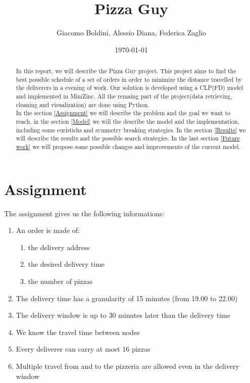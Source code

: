 \documentclass[10pt]{article}
\title{Pizza Guy}
\date{\today}
\author{Giacomo Boldini, Alessio Diana, Federica Zaglio}
\begin{document}
	\maketitle

	\begin{abstract}

		In this report, we will describe the Pizza Guy project. This project 
		aims to find the best possible schedule of a set of orders in order to
		minimize the distance travelled by the deliverers in a evening of 
		work. Our solution is developed using a CLP(FD) model and implemented 
		in MiniZinc. All the remaing part of the project(data retrieving, cleaning
		and visualization) are done using Python.\\	
		In the section \ref{Assignment} we will describe the problem and the goal
		we want to reach, in the section \ref{Model} we will the describe the 
		model and the implementation, including some euristichs and symmetry breaking
		strategies. In the section \ref{Results} we will describe the results and
		the possible search strategies. In the last section \ref{Future work} we 
		will propose some possible changes and improvements of the current model.
		
	\end{abstract}

	\tableofcontents

	\section{Assignment}
	\label{Assignment}
	
	The assignment gives us the following informations:
	\begin{enumerate}
		\item An order is made of:
		\begin{enumerate}
			\item the delivery address
			\item the desired delivery time
			\item the number of pizzas
		\end{enumerate}
		\item The delivery time has a granularity of 15 minutes (from 
			19.00 to 22.00)
		\item The delivery window is up to 30 minutes later than the delivery 
			time
		\item We know the travel time between nodes
		\item Every deliverer can carry at most 16 pizzas
		\item Multiple travel from and to the pizzeria are allowed even in the 
			delivery window
	\end{enumerate}
\end{document}
